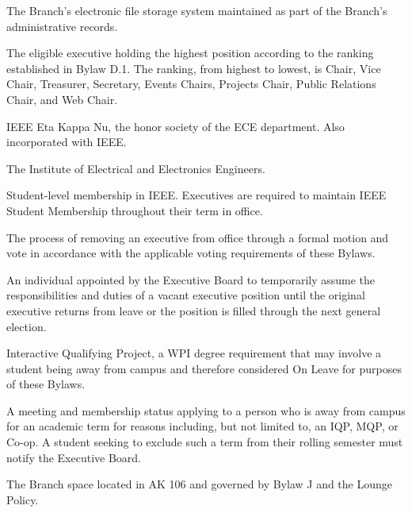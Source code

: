 \documentclass[11pt,a4paper]{article}
\begin{document}
\begin{description}[style=nextline, leftmargin=1.5em]
    \item[Google Drive]
    The Branch's electronic file storage system maintained as part of the Branch's administrative records.
    
    \item[Highest-Ranking Executive]
    The eligible executive holding the highest position according to the ranking established in Bylaw D.1. The ranking, from highest to lowest, is Chair, Vice Chair, Treasurer, Secretary, Events Chairs, Projects Chair, Public Relations Chair, and Web Chair.

    \item[HKN]
    IEEE Eta Kappa Nu, the honor society of the ECE department. Also incorporated with IEEE.

    \item[IEEE]
    The Institute of Electrical and Electronics Engineers.

    \item[IEEE Student Membership]
    Student-level membership in IEEE. Executives are required to maintain IEEE Student Membership throughout their term in office.

    \item[Impeachment]
    The process of removing an executive from office through a formal motion and vote in accordance with the applicable voting requirements of these Bylaws.

    \item[Interim Executive]
    An individual appointed by the Executive Board to temporarily assume the responsibilities and duties of a vacant executive position until the original executive returns from leave or the position is filled through the next general election.

    \item[IQP]
    Interactive Qualifying Project, a WPI degree requirement that may involve a student being away from campus and therefore considered On Leave for purposes of these Bylaws.

    \item[Leave / On Leave]
    A meeting and membership status applying to a person who is away from campus for an academic term for reasons including, but not limited to, an IQP, MQP, or Co-op. A student seeking to exclude such a term from their rolling semester must notify the Executive Board.

    \item[Lounge]
    The Branch space located in AK 106 and governed by Bylaw J and the Lounge Policy.


\end{description}
\end{document}
